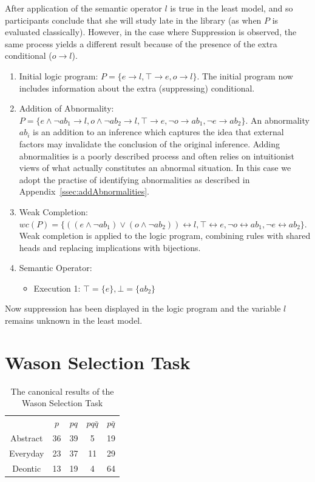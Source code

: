 \documentclass[
11pt, %
english, %
singlespacing, %
headsepline, %
]{MastersDoctoralThesis} %
\begin{document}
After application of the semantic operator $l$ is true in the least model, and so participants conclude that she will study late in the library (as when $P$ is evaluated classically). However, in the case where Suppression is observed, the same process yields a different result because of the presence of the extra conditional ($o\rightarrow l$).
\begin{enumerate}
\item Initial logic program: $P = \{e \rightarrow l, \top \rightarrow e, o \rightarrow l \}$. The initial program now includes information about the extra (suppressing) conditional.
\item Addition of Abnormality: $P = \{e \land \lnot ab_1 \rightarrow l, o \land \lnot ab_2 \rightarrow l, \top \rightarrow e, \lnot o \rightarrow ab_1, \lnot e \rightarrow ab_2 \}$. An abnormality $ab_i$ is an addition to an inference which captures the idea that external factors may invalidate the conclusion of the original inference. Adding abnormalities is a poorly described process and often relies on intuitionist views of what actually constitutes an abnormal situation. In this case we adopt the practise of identifying abnormalities as described in Appendix~\ref{ssec:addAbnormalities}.
\item Weak Completion: $wc(P) = \{((e \land \lnot ab_1) \lor (o \land \lnot ab_2)) \leftrightarrow l, \top \leftrightarrow e, \lnot o \leftrightarrow ab_1, \lnot e \leftrightarrow ab_2 \}$. Weak completion is applied to the logic program, combining rules with shared heads and replacing implications with bijections.
\item Semantic Operator:
\begin{itemize}
\item Execution 1: $\top=\{e\}, \bot=\{ab_2\}$
\end{itemize}
\end{enumerate}

Now suppression has been displayed in the logic program and the variable $l$ remains unknown in the least model.

\section{Wason Selection Task}

\begin{table}
\begin{center}


\begin{tabular}{ c c c c c}
  & \textbf{$p$} & \textbf{$pq$} & \textbf{$pq\bar{q}$} & \textbf{$p\bar{q}$}\\ 
 Abstract & 36 & 39 & 5 & 19\\  
 Everyday & 23 & 37 & 11 & 29\\  
 Deontic & 13 & 19 & 4 & 64
\end{tabular}
\caption{The canonical results of the Wason Selection Task}
\label{tbl:can}
\end{center}
\end{table}
\end{document}
